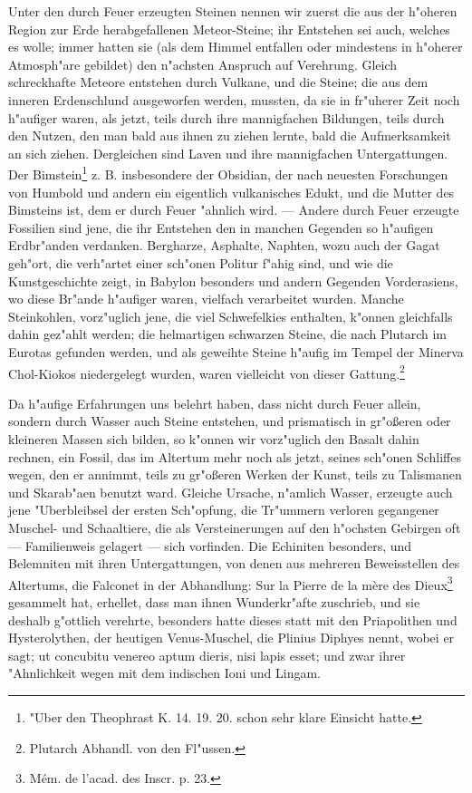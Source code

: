 \documentclass[a4paper, 11pt, oneside, polutonikogreek, german]{article}
\begin{document}
Unter den durch Feuer erzeugten Steinen nennen wir zuerst die aus der h"oheren Region zur Erde herabgefallenen Meteor-Steine; ihr Entstehen sei auch, welches es wolle; immer hatten sie (als dem Himmel entfallen oder mindestens in h"oherer Atmosph"are gebildet) den n"achsten Anspruch auf Verehrung. Gleich schreckhafte Meteore entstehen durch Vulkane, und die Steine; die aus dem inneren Erdenschlund ausgeworfen werden, mussten, da sie in fr"uherer Zeit noch h"aufiger waren, als jetzt, teils durch ihre mannigfachen Bildungen, teils durch den Nutzen, den man bald aus ihnen zu ziehen lernte, bald die Aufmerksamkeit an sich ziehen. Dergleichen sind Laven und ihre mannigfachen Untergattungen. Der Bimstein\footnote{"Uber den Theophrast K. 14. 19. 20. schon sehr klare Einsicht hatte.} z. B. insbesondere der Obsidian, der nach neuesten Forschungen von Humbold und andern ein eigentlich vulkanisches Edukt, und die Mutter des Bimsteins ist, dem er durch Feuer "ahnlich wird. --- Andere durch Feuer erzeugte Fossilien sind jene, die ihr Entstehen den in manchen Gegenden so h"aufigen Erdbr"anden verdanken. Bergharze, Asphalte, Naphten, wozu auch der Gagat geh"ort, die verh"artet einer sch"onen Politur f"ahig sind, und wie die Kunstgeschichte zeigt, in Babylon besonders und andern Gegenden Vorderasiens, wo diese Br"ande h"aufiger waren, vielfach verarbeitet wurden. Manche Steinkohlen, vorz"uglich jene, die viel Schwefelkies enthalten, k"onnen gleichfalls dahin gez"ahlt werden; die helmartigen schwarzen Steine, die nach Plutarch im Eurotas gefunden werden, und als geweihte Steine h"aufig im Tempel der Minerva Chol-Kiokos niedergelegt wurden, waren vielleicht von dieser Gattung.\footnote{Plutarch Abhandl. von den Fl"ussen.}

Da h"aufige Erfahrungen uns belehrt haben, dass nicht durch Feuer allein, sondern durch Wasser auch Steine entstehen, und prismatisch in gr"oßeren oder kleineren Massen sich bilden, so k"onnen wir vorz"uglich den Basalt dahin rechnen, ein Fossil, das im Altertum mehr noch als jetzt, seines sch"onen Schliffes wegen, den er annimmt, teils zu gr"oßeren Werken der Kunst, teils zu Talismanen und Skarab"aen benutzt ward. Gleiche Ursache, n"amlich Wasser, erzeugte auch jene "Uberbleibsel der ersten Sch"opfung, die Tr"ummern verloren gegangener Muschel- und Schaaltiere, die als Versteinerungen auf den h"ochsten Gebirgen oft --- Familienweis gelagert --- sich vorfinden. Die Echiniten besonders, und Belemniten mit ihren Untergattungen, von denen aus mehreren Beweisstellen des Altertums, die Falconet in der Abhandlung: Sur la Pierre de la mère des Dieux\footnote{Mém. de l'acad. des Inscr. p. 23.} gesammelt hat, erhellet, dass man ihnen Wunderkr"afte zuschrieb, und sie deshalb g"ottlich verehrte, besonders hatte dieses statt mit den Priapolithen und Hysterolythen, der heutigen Venus-Muschel, die Plinius Diphyes nennt, wobei er sagt; ut concubitu venereo aptum dieris, nisi lapis esset; und zwar ihrer "Ahnlichkeit wegen mit dem indischen Ioni und Lingam.
\end{document}
